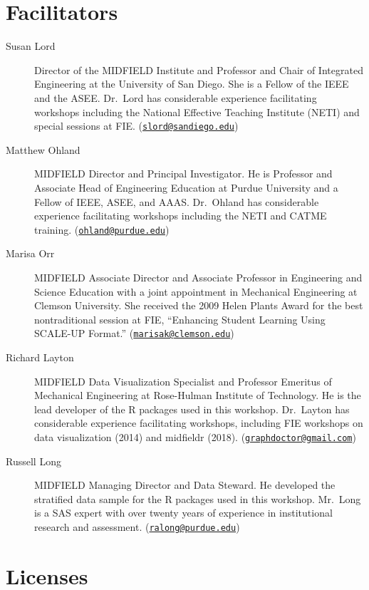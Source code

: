 \documentclass[
]{book}
\begin{document}
\hypertarget{facilitators}{%
\section{Facilitators}\label{facilitators}}

\begin{description}
\item[Susan Lord]
Director of the MIDFIELD Institute and Professor and Chair of Integrated Engineering at the University of San Diego. She is a Fellow of the IEEE and the ASEE. Dr.~Lord has considerable experience facilitating workshops including the National Effective Teaching Institute (NETI) and special sessions at FIE. (\href{mailto:slord@sandiego.edu}{\nolinkurl{slord@sandiego.edu}})
\item[Matthew Ohland]
MIDFIELD Director and Principal Investigator. He is Professor and Associate Head of Engineering Education at Purdue University and a Fellow of IEEE, ASEE, and AAAS. Dr.~Ohland has considerable experience facilitating workshops including the NETI and CATME training. (\href{mailto:ohland@purdue.edu}{\nolinkurl{ohland@purdue.edu}})
\item[Marisa Orr]
MIDFIELD Associate Director and Associate Professor in Engineering and Science Education with a joint appointment in Mechanical Engineering at Clemson University. She received the 2009 Helen Plants Award for the best nontraditional session at FIE, ``Enhancing Student Learning Using SCALE-UP Format.'' (\href{mailto:marisak@clemson.edu}{\nolinkurl{marisak@clemson.edu}})
\item[Richard Layton]
MIDFIELD Data Visualization Specialist and Professor Emeritus of Mechanical Engineering at Rose-Hulman Institute of Technology. He is the lead developer of the R packages used in this workshop. Dr.~Layton has considerable experience facilitating workshops, including FIE workshops on data visualization (2014) and midfieldr (2018). (\href{mailto:graphdoctor@gmail.com}{\nolinkurl{graphdoctor@gmail.com}})
\item[Russell Long]
MIDFIELD Managing Director and Data Steward. He developed the stratified data sample for the R packages used in this workshop. Mr.~Long is a SAS expert with over twenty years of experience in institutional research and assessment. (\href{mailto:ralong@purdue.edu}{\nolinkurl{ralong@purdue.edu}})
\end{description}

\hypertarget{licenses}{%
\section{Licenses}\label{licenses}}
\end{document}
